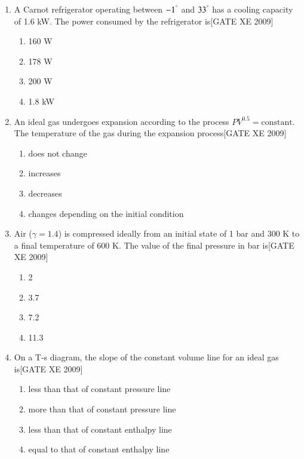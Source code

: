\documentclass[journal,12pt,onecolumn]{IEEEtran}
\theoremstyle{remark}
\begin{document}
\begin{enumerate}
\item  A Carnot refrigerator operating between $-1^\degree$  and $33^\degree$  has a cooling capacity of 1.6 kW. The power consumed by the refrigerator is\hfill[GATE XE 2009]
\begin{multicols}{2}
\begin{enumerate}
    \item 160 W
    \item 178 W
    \item 200 W
    \item 1.8 kW
\end{enumerate}
\end{multicols}



\item An ideal gas undergoes expansion according to the process $PV^{0.5} = \text{constant}$. The temperature of the gas during the expansion process\hfill[GATE XE 2009]
\begin{multicols}{2}
\begin{enumerate}
    \item does not change
    \item increases
    \item decreases
    \item changes depending on the initial condition
\end{enumerate}
\end{multicols}



\item  Air ($\gamma=1.4$) is compressed ideally from an initial state of 1 bar and 300 K to a final temperature of 600 K. The value of the final pressure in bar is\hfill[GATE XE 2009]
\begin{multicols}{2}
\begin{enumerate}
    \item 2
    \item 3.7
    \item 7.2
    \item 11.3
\end{enumerate}
\end{multicols}



\item  On a T-s diagram, the slope of the constant volume line for an ideal gas is\hfill[GATE XE 2009]
\begin{multicols}{2}
\begin{enumerate}
    \item less than that of constant pressure line
    \item more than that of constant pressure line
    \item less than that of constant enthalpy line
    \item equal to that of constant enthalpy line
\end{enumerate}
\end{multicols}




\end{enumerate}
\end{document}

